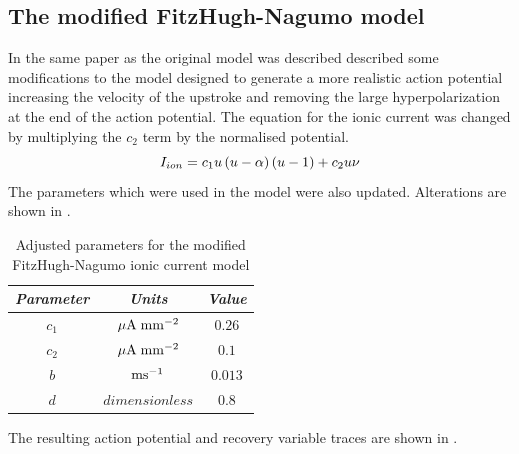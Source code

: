 \subsection{The modified FitzHugh-Nagumo model}
\label{The_modified_FitzHugh-Nagumo_Model}
In the same paper as the original model was described  described
some modifications to the model designed to generate a more realistic action
potential increasing the velocity of the upstroke and removing the large
hyperpolarization at the end of the action potential. The equation for the
ionic current was changed by multiplying the $c_2$ term by the normalised
potential. 
\begin{equation}
  I_{ion} = c_1 u \left( u - \alpha \right) \left( u - 1 \right) + c_2 u \nu
  \label{eqn:mod_FHN_excitation_equation}
\end{equation}
The parameters which were used in the model were also updated. Alterations are
shown in .
\begin{table}[hbtp] \centering
  \begin{tabular}{|c|c|c|}
    \hline
    \emph{Parameter} & \emph{Units} & \emph{Value} \\ 
    \hline
    \hline 
    $c_1$ & $\mathrm{\mu A}\thickspace\mathrm{mm}^{-2}$ & $0.26$ \\
    $c_2$ & $\mathrm{\mu A}\thickspace\mathrm{mm}^{-2}$ & $0.1$ \\
    $b$ & $\mathrm{\mathrm{ms}^{-1}}$ & $0.013$ \\
    $d$ & $dimensionless$ & $0.8$ \\
    \hline
  \end{tabular}
  \caption[Adjusted parameters for the modified FitzHugh-Nagumo ionic current
  model]{Adjusted parameters for the modified FitzHugh-Nagumo ionic current model}
  \label{tab:mod_FitzHugh-Nagumo_Model_Params}
\end{table}
The resulting action potential and recovery variable traces are shown in
.
